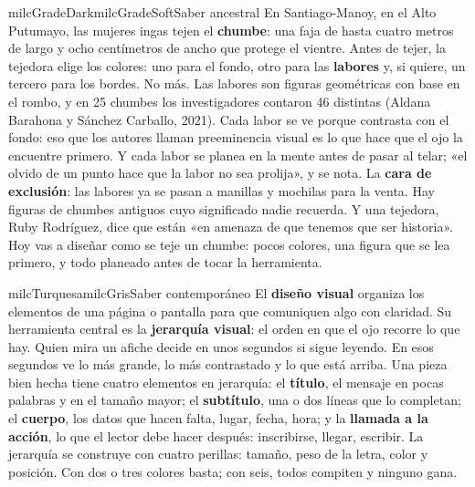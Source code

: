 \documentclass[11pt,letterpaper]{article}
\begin{document}
\begin{softbox}{milcGradeDark}{milcGradeSoft}{Saber ancestral}
En Santiago-Manoy, en el Alto Putumayo, las mujeres ingas tejen el \textbf{chumbe}: una faja de hasta cuatro metros de largo y ocho centímetros de ancho que protege el vientre. Antes de tejer, la tejedora elige los colores: uno para el fondo, otro para las \textbf{labores} y, si quiere, un tercero para los bordes. No más. Las labores son figuras geométricas con base en el rombo, y en 25 chumbes los investigadores contaron 46 distintas (Aldana Barahona y Sánchez Carballo, 2021). Cada labor se ve porque contrasta con el fondo: eso que los autores llaman preeminencia visual es lo que hace que el ojo la encuentre primero. Y cada labor se planea en la mente antes de pasar al telar; «el olvido de un punto hace que la labor no sea prolija», y se nota. La \textbf{cara de exclusión}: las labores ya se pasan a manillas y mochilas para la venta. Hay figuras de chumbes antiguos cuyo significado nadie recuerda. Y una tejedora, Ruby Rodríguez, dice que están «en amenaza de que tenemos que ser historia». Hoy vas a diseñar como se teje un chumbe: pocos colores, una figura que se lea primero, y todo planeado antes de tocar la herramienta.\par{}
\end{softbox}

\begin{softbox}{milcTurquesa}{milcGris}{Saber contemporáneo}
El \textbf{diseño visual} organiza los elementos de una página o pantalla para que comuniquen algo con claridad. Su herramienta central es la \textbf{jerarquía visual}: el orden en que el ojo recorre lo que hay. Quien mira un afiche decide en unos segundos si sigue leyendo. En esos segundos ve lo más grande, lo más contrastado y lo que está arriba. Una pieza bien hecha tiene cuatro elementos en jerarquía: el \textbf{título}, el mensaje en pocas palabras y en el tamaño mayor; el \textbf{subtítulo}, una o dos líneas que lo completan; el \textbf{cuerpo}, los datos que hacen falta, lugar, fecha, hora; y la \textbf{llamada a la acción}, lo que el lector debe hacer después: inscribirse, llegar, escribir. La jerarquía se construye con cuatro perillas: tamaño, peso de la letra, color y posición. Con dos o tres colores basta; con seis, todos compiten y ninguno gana.
\end{softbox}
\end{document}
